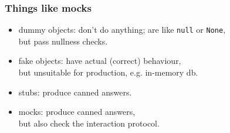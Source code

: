 \documentclass{beamer}
\newenvironment{changemargin}[1]{%
  \begin{list}{}{%
    \setlength{\topsep}{0pt}%
    \setlength{\leftmargin}{#1}%
    \setlength{\rightmargin}{1em}
    \setlength{\listparindent}{\parindent}%
    \setlength{\itemindent}{\parindent}%
    \setlength{\parsep}{\parskip}%
  }%
  \item[]}{\end{list}}
\begin{document}
\begin{frame}[fragile]
  \frametitle{Things like mocks}
  \begin{changemargin}{1cm}
    \begin{itemize}
      \item \alert{dummy objects}: don't do anything; are like \texttt{null} or \texttt{None}, \\ \hspace*{1em} but pass nullness checks.
      \item \alert{fake objects}: have actual (correct) behaviour, \\ \hspace*{1em} but unsuitable for production, e.g. in-memory db.
      \item \alert{stubs}: produce canned answers.
      \item \alert{mocks}: produce canned answers, \\ \hspace*{1em} but also check the interaction protocol.
    \end{itemize}
  \end{changemargin}
\end{frame}
\end{document}
